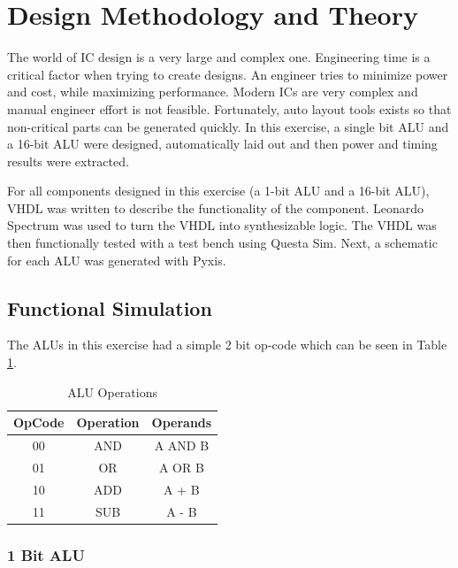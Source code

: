 \documentclass[11pt]{article}
\begin{document}
\section{Design Methodology and Theory}

	The world of IC design is a very large and complex one. Engineering time is a critical factor when trying to create designs. An engineer tries to minimize power and cost, while maximizing performance. Modern ICs are very complex and manual engineer effort is not feasible. Fortunately, auto layout tools exists so that non-critical parts can be generated quickly. In this exercise, a single bit ALU and a 16-bit ALU were designed, automatically laid out and then power and timing results were extracted. 
	
	For all components designed in this exercise (a 1-bit ALU and a 16-bit ALU), VHDL was written to describe the functionality of the component. Leonardo Spectrum was used to turn the VHDL into synthesizable logic. The VHDL was then functionally tested with a test bench using Questa Sim. Next, a schematic for each ALU was generated with Pyxis. 
	

	\subsection{Functional Simulation}
	
		The ALUs in this exercise had a simple 2 bit op-code which can be seen in Table \ref{tab:OpCodes}.
	
		\begin{table}[H]
			\centering
			\caption{ALU Operations}
			\label{tab:OpCodes}
			\begin{tabular}{|ccc|}
				\hline
				\textbf{OpCode} & \textbf{Operation} & \textbf{Operands} \\
				\hline
				00              & AND                & A AND B           \\
				01              & OR                 & A OR B            \\
				10              & ADD                & A + B             \\
				11              & SUB                & A - B   \\   
				\hline       
			\end{tabular}
		\end{table}
	
		\subsubsection{1 Bit ALU}
		
\end{document}
